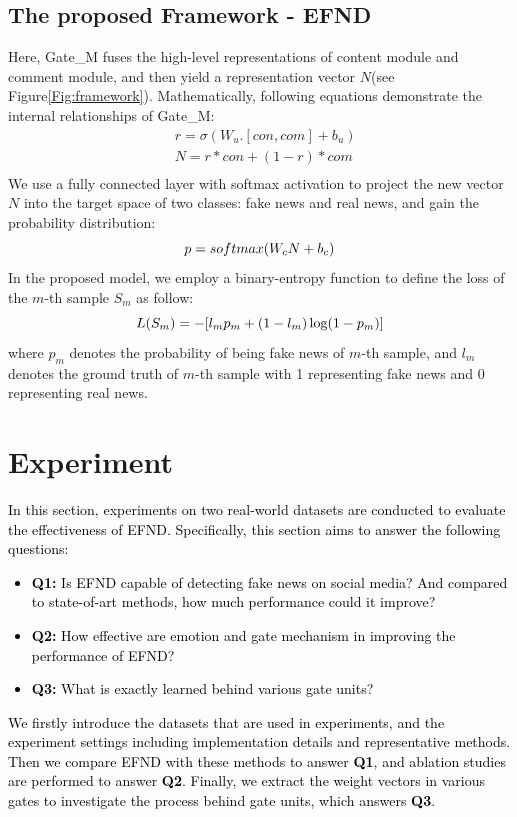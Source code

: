 \documentclass[conference]{IEEEtran}
\newcommand{\m}{EFND}
\newcommand{\new}[1]{\textcolor{black}{{#1}}}
\begin{document}
	\subsection{The proposed Framework - {\m}}
	Here, Gate\_M fuses the high-level representations of content module and comment module, and then yield a representation vector $N$(see Figure\ref{Fig:framework}). Mathematically, following equations demonstrate the internal relationships of Gate\_M: 
	\begin{equation}
	\begin{aligned}
	&r = \sigma(W_u.[con, com] + b_u)\\
	&N = r*con + (1-r)*com\\
	\end{aligned}
	\end{equation}
	We use a fully connected layer with softmax activation to project the new vector $N$ into the target space of two classes: fake news and real news, and gain the probability distribution:
	\begin{equation}
	\centering
	p = softmax(W_cN+b_c)
	\end{equation}
	In the proposed model, we employ a binary-entropy function to define the loss of the $m$-th sample $S_m$ as follow:
	\begin{equation}
	\centering
	L(S_m) = -[l_mp_m + (1-l_m)\log(1-p_m)]
	\end{equation}
	where $p_m$ denotes the probability of being fake news of $m$-th sample, and $l_m$ denotes the ground truth of $m$-th sample with 1 representing fake news and 0 representing real news. 
	
	
	\section{Experiment}
	\new{In this section, experiments on two real-world datasets are conducted to evaluate the effectiveness of {\m}. Specifically, this section aims to answer the following questions:
		\begin{itemize}
			\item \textbf{Q1:} Is {\m}  capable of detecting fake news on social media? And compared to state-of-art methods, how much performance could it improve? 
			\item \textbf{Q2:} How effective are emotion and gate mechanism in improving the performance of {\m}?  
			\item \textbf{Q3:} What is exactly learned behind various gate units?
		\end{itemize} 
	We firstly introduce the datasets that are used in experiments, and the experiment settings including implementation details and representative methods. Then we compare {\m} with these methods to answer \textbf{Q1}, and ablation studies are performed to answer \textbf{Q2}. Finally, we extract the weight vectors in various gates to investigate the process behind gate units, which answers \textbf{Q3}. 
	}
	
\end{document}
